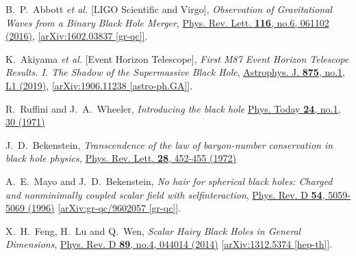 \documentclass[pr, twocolumn, preprintnumbers, showpacs,footnoteadded, superscriptaddress,nofootinbib,longbibliography]{revtex4-1}
\begin{document}
\begin{thebibliography}{99}

B.~P.~Abbott \textit{et al.} [LIGO Scientific and Virgo],
\emph{Observation of Gravitational Waves from a Binary Black Hole Merger},
\href{http://dx.doi.org/10.1103/PhysRevLett.116.061102}{Phys. Rev. Lett. \textbf{116}, no.6, 061102 (2016)},
\href{https://arxiv.org/ftp/arxiv/papers/1602/1602.03837.pdf}{[arXiv:1602.03837 [gr-qc]]}.


K.~Akiyama \textit{et al.} [Event Horizon Telescope],
\emph{First M87 Event Horizon Telescope Results. I. The Shadow of the Supermassive Black Hole},
\href{https://iopscience.iop.org/article/10.3847/2041-8213/ab0ec7}{Astrophys. J. \textbf{875}, no.1, L1 (2019)},
\href{https://arxiv.org/ftp/arxiv/papers/1906/1906.11238.pdf}{[arXiv:1906.11238 [astro-ph.GA]]}.

R.~Ruffini and J.~A.~Wheeler,
\emph{Introducing the black hole}
\href{https://physicstoday.scitation.org/doi/10.1063/1.3022513}{Phys. Today \textbf{24}, no.1, 30 (1971)}

J.~D.~Bekenstein,
\emph{Transcendence of the law of baryon-number conservation in black hole physics,}
\href{https://journals.aps.org/prl/abstract/10.1103/PhysRevLett.28.452}{Phys. Rev. Lett. \textbf{28}, 452-455 (1972)}

A.~E.~Mayo and J.~D.~Bekenstein,
\emph{No hair for spherical black holes: Charged and nonminimally coupled scalar field with selfinteraction},
\href{https://journals.aps.org/prd/abstract/10.1103/PhysRevD.54.5059}{Phys. Rev. D \textbf{54}, 5059-5069 (1996)}
[\href{https://arxiv.org/pdf/gr-qc/9602057.pdf}{arXiv:gr-qc/9602057 [gr-qc]}].

X.~H.~Feng, H.~Lu and Q.~Wen,
\emph{Scalar Hairy Black Holes in General Dimensions},
\href{https://journals.aps.org/prd/abstract/10.1103/PhysRevD.89.044014}{Phys. Rev. D \textbf{89}, no.4, 044014 (2014)}
[\href{https://arxiv.org/pdf/1312.5374.pdf}{arXiv:1312.5374 [hep-th]}].


\end{thebibliography}
\end{document}
